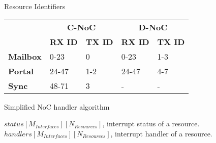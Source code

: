 \begin{backup}
	\begin{frame}[fragile]{Resource Identifiers}
		\begin{table}
			\centering%
			\begin{tabular}{l|l|l|l|l|}
				\cline{2-5}
														& \multicolumn{2}{c|}{\textbf{C-NoC}} & \multicolumn{2}{c|}{\textbf{D-NoC}} \\ \cline{2-5}
														& \textbf{RX ID} & \textbf{TX ID}     & \textbf{RX ID}  & \textbf{TX ID}    \\ \hline
				\multicolumn{1}{|l|}{\textbf{Mailbox}} & 0-23           & 0                  & 0-23            & 1-3               \\ \hline
				\multicolumn{1}{|l|}{\textbf{Portal}}  & 24-47          & 1-2                & 24-47           & 4-7               \\ \hline
				\multicolumn{1}{|l|}{\textbf{Sync}}    & 48-71          & 3                  & -               & -                 \\ \hline
			\end{tabular}
		\end{table}


	\end{frame}

	\begin{frame}[fragile]{Simplified NoC handler algorithm}
			
		\begin{algorithm}
			\begin{algorithmic}[1]
				\Require $status[M_{Interfaces}][N_{Resources}]$, interrupt status of a resource.
				\Require $handlers[M_{Interfaces}][N_{Resources}]$, interrupt handler of a resource.
						\EndIf
					\EndFor
				\EndFor
				\EndProcedure
			\end{algorithmic}%
		\end{algorithm}


\end{frame}
\end{backup}
